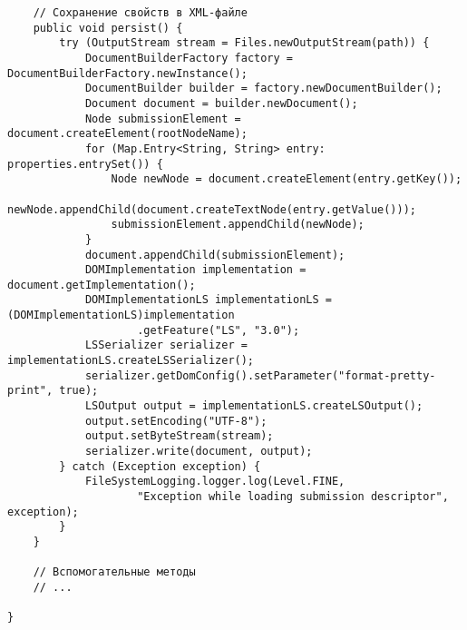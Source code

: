 \begin{verbatim}
    // Сохранение свойств в XML-файле
    public void persist() {
        try (OutputStream stream = Files.newOutputStream(path)) {
            DocumentBuilderFactory factory = DocumentBuilderFactory.newInstance();
            DocumentBuilder builder = factory.newDocumentBuilder();
            Document document = builder.newDocument();
            Node submissionElement = document.createElement(rootNodeName);
            for (Map.Entry<String, String> entry: properties.entrySet()) {
                Node newNode = document.createElement(entry.getKey());
                newNode.appendChild(document.createTextNode(entry.getValue()));
                submissionElement.appendChild(newNode);
            }
            document.appendChild(submissionElement);
            DOMImplementation implementation = document.getImplementation();
            DOMImplementationLS implementationLS = (DOMImplementationLS)implementation
                    .getFeature("LS", "3.0");
            LSSerializer serializer = implementationLS.createLSSerializer();
            serializer.getDomConfig().setParameter("format-pretty-print", true);
            LSOutput output = implementationLS.createLSOutput();
            output.setEncoding("UTF-8");
            output.setByteStream(stream);
            serializer.write(document, output);
        } catch (Exception exception) {
            FileSystemLogging.logger.log(Level.FINE,
                    "Exception while loading submission descriptor", exception);
        }
    }
    
    // Вспомогательные методы
    // ...
    
}
\end{verbatim}